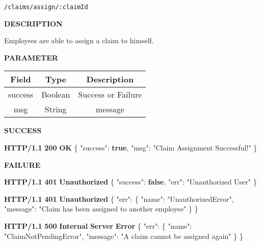 \documentclass[
]{article}
\newenvironment{Shaded}{}{}
\newcommand{\DataTypeTok}[1]{\textcolor[rgb]{0.56,0.13,0.00}{#1}}
\newcommand{\ErrorTok}[1]{\textcolor[rgb]{1.00,0.00,0.00}{\textbf{#1}}}
\newcommand{\FunctionTok}[1]{\textcolor[rgb]{0.02,0.16,0.49}{#1}}
\newcommand{\KeywordTok}[1]{\textcolor[rgb]{0.00,0.44,0.13}{\textbf{#1}}}
\newcommand{\StringTok}[1]{\textcolor[rgb]{0.25,0.44,0.63}{#1}}
\begin{document}
\begin{verbatim}
/claims/assign/:claimId
\end{verbatim}

\textbf{DESCRIPTION}

Employees are able to assign a claim to himself.

\textbf{PARAMETER}

\begin{longtable}[]{@{}ccc@{}}
\toprule
Field & Type & Description\tabularnewline
\midrule
\endhead
success & Boolean & Success or Failure\tabularnewline
msg & String & message\tabularnewline
\bottomrule
\end{longtable}

\textbf{SUCCESS}

\begin{Shaded}
\begin{Highlighting}[]
\ErrorTok{HTTP/1.1} \ErrorTok{200} \ErrorTok{OK}
\FunctionTok{\{}
    \DataTypeTok{"success"}\FunctionTok{:} \KeywordTok{true}\FunctionTok{,}
    \DataTypeTok{"msg"}\FunctionTok{:} \StringTok{"Claim Assignment Successful!"}
\FunctionTok{\}}
\end{Highlighting}
\end{Shaded}

\textbf{FAILURE}

\begin{Shaded}
\begin{Highlighting}[]
\ErrorTok{HTTP/1.1} \ErrorTok{401} \ErrorTok{Unauthorized}
\FunctionTok{\{}
    \DataTypeTok{"success"}\FunctionTok{:} \KeywordTok{false}\FunctionTok{,}
    \DataTypeTok{"err"}\FunctionTok{:} \StringTok{"Unauthorized User"}
\FunctionTok{\}}
\end{Highlighting}
\end{Shaded}

\begin{Shaded}
\begin{Highlighting}[]
\ErrorTok{HTTP/1.1} \ErrorTok{401} \ErrorTok{Unauthorized}
\FunctionTok{\{}
    \DataTypeTok{"err"}\FunctionTok{:} \FunctionTok{\{}
        \DataTypeTok{"name"}\FunctionTok{:} \StringTok{"UnauthorizedError"}\FunctionTok{,}
        \DataTypeTok{"message"}\FunctionTok{:} \StringTok{"Claim has been assigned to another employee"}
    \FunctionTok{\}}
\FunctionTok{\}}
\end{Highlighting}
\end{Shaded}

\begin{Shaded}
\begin{Highlighting}[]
\ErrorTok{HTTP/1.1} \ErrorTok{500} \ErrorTok{Internal} \ErrorTok{Server} \ErrorTok{Error}
\FunctionTok{\{}
    \DataTypeTok{"err"}\FunctionTok{:} \FunctionTok{\{}
        \DataTypeTok{"name"}\FunctionTok{:} \StringTok{"ClaimNotPendingError"}\FunctionTok{,}
        \DataTypeTok{"message"}\FunctionTok{:} \StringTok{"A claim cannot be assigned again"}
    \FunctionTok{\}}
\FunctionTok{\}}
\end{Highlighting}
\end{Shaded}
\end{document}
